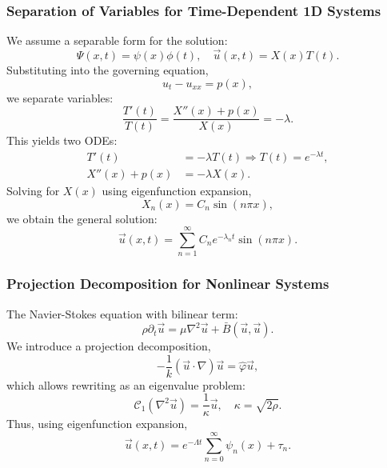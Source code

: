 \documentclass[12pt]{article}
\begin{document}
\subsubsection{Separation of Variables for Time-Dependent 1D Systems}
We assume a separable form for the solution:
\begin{equation}
    \Psi(x,t) = \psi(x)\phi(t), \quad \vec{u}(x,t) = X(x)T(t).
\end{equation}
Substituting into the governing equation,
\begin{equation}
    u_t - u_{xx} = p(x),
\end{equation}
we separate variables:
\begin{equation}
    \frac{T'(t)}{T(t)} = \frac{X''(x) + p(x)}{X(x)} = -\lambda.
\end{equation}
This yields two ODEs:
\begin{align}
    T'(t) &= -\lambda T(t) \Rightarrow T(t) = e^{-\lambda t}, \\
    X''(x) + p(x) &= -\lambda X(x).
\end{align}
Solving for $X(x)$ using eigenfunction expansion,
\begin{equation}
    X_n(x) = C_n \sin(n \pi x),
\end{equation}
we obtain the general solution:
\begin{equation}
    \vec{u}(x,t) = \sum_{n=1}^{\infty} C_n e^{-\lambda_n t} \sin(n \pi x).
\end{equation}

\subsubsection{Projection Decomposition for Nonlinear Systems}
The Navier-Stokes equation with bilinear term:
\begin{equation}
    \rho \partial_t \vec{u} = \mu \nabla^2 \vec{u} + \bar{B}(\vec{u},\vec{u}).
\end{equation}
We introduce a projection decomposition,
\begin{equation}
    - \frac{1}{k} (\vec{u} \cdot \nabla) \vec{u} = \hat{\varphi} \vec{u},
\end{equation}
which allows rewriting as an eigenvalue problem:
\begin{equation}
    \mathcal{C}_1(\nabla^2 \vec{u}) = \frac{1}{\kappa} \vec{u}, \quad \kappa = \sqrt{2 \rho}.
\end{equation}
Thus, using eigenfunction expansion,
\begin{equation}
    \vec{u}(x,t) = e^{-\Lambda t} \sum_{n=0}^{\infty} \psi_n(x) + \tau_n.
\end{equation}
\end{document}
